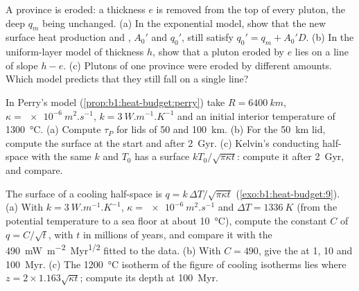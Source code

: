 \begin{exercise}[$\star\star\star$]\label{exo:b1:heat-budget:10}
A province is eroded: a thickness $e$ is removed from the top of every pluton,
the deep  $q_m$ being unchanged. (a) In the exponential model, show
that the new surface heat production and , $A_0'$ and $q_0'$, still
satisfy $q_0' = q_m + A_0'D$. (b) In the uniform-layer model of thickness $h$,
show that a pluton eroded by $e$ lies on a line of slope $h - e$. (c) Plutons of
one province were eroded by different amounts. Which model predicts that they
still fall on a single line?
\end{exercise}

\begin{exercise}[$\star\star\star$]\label{exo:b1:heat-budget:11}
In Perry's model (\cref{prop:b1:heat-budget:perry}) take $R = \qty{6400}{km}$,
$\kappa = \qty{e-6}{m^2.s^{-1}}$, $k = \qty{3}{W.m^{-1}.K^{-1}}$ and an initial
interior temperature of \qty{1300}{\degreeCelsius}. (a) Compute $\tau_P$ for
lids of 50 and \qty{100}{km}. (b) For the \qty{50}{km} lid, compute the surface
 at the start and after \qty{2}{Gyr}. (c) Kelvin's conducting
half-space with the same $k$ and $T_0$ has a surface 
$kT_0/\sqrt{\pi\kappa t}$: compute it after \qty{2}{Gyr}, and compare.
\end{exercise}

\begin{exercise}[$\star\star\star$]\label{exo:b1:heat-budget:12}
The surface  of a cooling half-space is $q = k\,\Delta T/\sqrt{\pi\kappa t}$
(\cref{exo:b1:heat-budget:9}). (a) With $k = \qty{3}{W.m^{-1}.K^{-1}}$, $\kappa =
\qty{e-6}{m^2.s^{-1}}$ and $\Delta T = \qty{1336}{K}$ (from the potential
temperature to a sea floor at about \qty{10}{\degreeCelsius}), compute the
constant $C$ of $q = C/\sqrt t$, with $t$ in millions of years, and compare it
with the \qty{490}{mW.m^{-2}.Myr^{1/2}} fitted to the data. (b) With
$C = 490$, give the  at 1, 10 and \qty{100}{Myr}. (c) The
\qty{1200}{\degreeCelsius} isotherm of the figure of cooling isotherms lies
where $z = 2\times1.163\sqrt{\kappa t}$; compute its depth at \qty{100}{Myr}.
\end{exercise}

